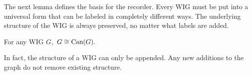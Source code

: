 The next lemma defines the basis for the recorder. Every WIG must be put into a universal form that can be labeled in completely different ways. The underlying structure of the WIG is always preserved, no matter what labels are added.
\begin{lemma} For any WIG $G,$ $G \cong \textrm{Can}(G).$
\end{lemma}

In fact, the structure of a WIG can only be appended. Any new additions to the graph do not remove existing structure.




